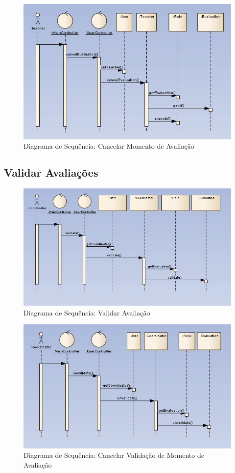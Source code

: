 \begin{figure}[!htbp]
\centering
\includegraphics{imagens/cancelar_avaliacao.jpg}
\caption{Diagrama de Sequência: Cancelar Momento de Avaliação}
\label{fig:cancelar_avaliacao}
\end{figure}


\clearpage
\subsection{Validar Avaliações}

\begin{figure}[!htbp]
\centering
\includegraphics{imagens/validar_momento_de_avaliacao.jpg}
\caption{Diagrama de Sequência: Validar Avaliação}
\label{fig:validar_avaliacao}
\end{figure}

\begin{figure}[!htbp]
\centering
\includegraphics{imagens/cancelar_validacao.jpg}
\caption{Diagrama de Sequência: Cancelar Validação de Momento de Avaliação}
\label{fig:cancelar_validacao}
\end{figure}